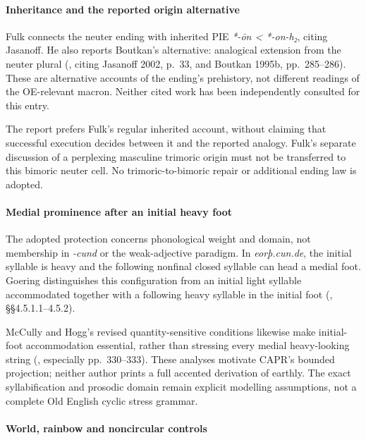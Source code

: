 \documentclass[
  british,
  a4paper,
]{article}
\begin{document}
\paragraph{Inheritance and the reported origin
alternative}\label{inheritance-and-the-reported-origin-alternative}

Fulk connects the neuter ending with inherited PIE
\emph{*-ōn < *-on-h₂}, citing Jasanoff. He also reports Boutkan's
alternative: analogical extension from the neuter plural
(, citing Jasanoff 2002, p.~33,
and Boutkan 1995b, pp.~285--286). These are alternative accounts of the
ending's prehistory, not different readings of the OE-relevant macron.
Neither cited work has been independently consulted for this entry.

The report prefers Fulk's regular inherited account, without claiming
that successful execution decides between it and the reported analogy.
Fulk's separate discussion of a perplexing masculine trimoric origin
must not be transferred to this bimoric neuter cell. No
trimoric-to-bimoric repair or additional ending law is adopted.

\paragraph{Medial prominence after an initial heavy
foot}\label{medial-prominence-after-an-initial-heavy-foot}

The adopted protection concerns phonological weight and domain, not
membership in \emph{-cund} or the weak-adjective paradigm. In
\emph{eorþ.cun.de}, the initial syllable is heavy and the following
nonfinal closed syllable can head a medial foot. Goering distinguishes
this configuration from an initial light syllable accommodated together
with a following heavy syllable in the initial foot
(, §§4.5.1.1--4.5.2).

McCully and Hogg's revised quantity-sensitive conditions likewise make
initial-foot accommodation essential, rather than stressing every medial
heavy-looking string (, especially pp.~330--333). These analyses motivate CAPR's
bounded projection; neither author prints a full accented derivation of
earthly. The exact syllabification and prosodic domain remain explicit
modelling assumptions, not a complete Old English cyclic stress grammar.

\paragraph{World, rainbow and noncircular
controls}\label{world-rainbow-and-noncircular-controls}
\end{document}

